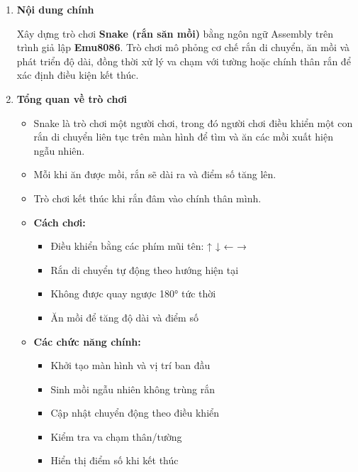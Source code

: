 \begin{enumerate}[leftmargin=*, label=\textbf{\arabic*.}, itemsep=1em]
    
    \item \textbf{Nội dung chính}
    
    \vspace{0.3cm}
    \noindent\hangindent=1cm 
    Xây dựng trò chơi \textbf{Snake (rắn săn mồi)} bằng ngôn ngữ Assembly trên trình giả lập \textbf{Emu8086}. Trò chơi mô phỏng cơ chế rắn di chuyển, ăn mồi và phát triển độ dài, đồng thời xử lý va chạm với tường hoặc chính thân rắn để xác định điều kiện kết thúc.
    
    \item \textbf{Tổng quan về trò chơi}
    
    \begin{itemize}[leftmargin=1.5em, label=$\bullet$]
        \item Snake là trò chơi một người chơi, trong đó người chơi điều khiển một con rắn di chuyển liên tục trên màn hình để tìm và ăn các mồi xuất hiện ngẫu nhiên.
        
        \item Mỗi khi ăn được mồi, rắn sẽ dài ra và điểm số tăng lên.
        
        \item Trò chơi kết thúc khi rắn đâm vào chính thân mình.
        
        \item \textbf{Cách chơi:}
        \begin{itemize}[leftmargin=1.5em, label=$\circ$]
            \item Điều khiển bằng các phím mũi tên: ↑ ↓ ← →
            \item Rắn di chuyển tự động theo hướng hiện tại
            \item Không được quay ngược 180° tức thời
            \item Ăn mồi để tăng độ dài và điểm số
        \end{itemize}
        
        \item \textbf{Các chức năng chính:}
        \begin{itemize}[leftmargin=1.5em, label=$\circ$]
            \item Khởi tạo màn hình và vị trí ban đầu
            \item Sinh mồi ngẫu nhiên không trùng rắn
            \item Cập nhật chuyển động theo điều khiển
            \item Kiểm tra va chạm thân/tường
            \item Hiển thị điểm số khi kết thúc
        \end{itemize}
    \end{itemize}


\end{enumerate}
